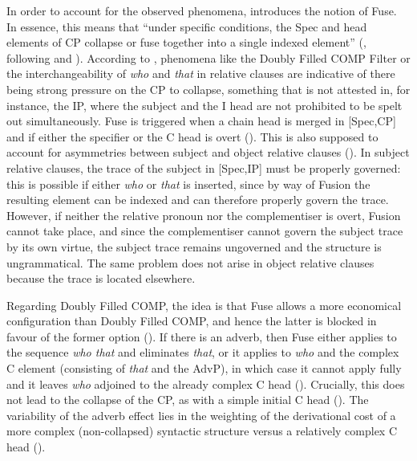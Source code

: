 \ea
{}
\z
\z

In order to account for the observed phenomena, \citet[545]{sobin2002} introduces the notion of Fuse. In essence, this means that ``under specific conditions, the Spec and head elements of CP collapse or fuse together into a single indexed element'' (\citealt[545]{sobin2002}, following \citealt{pesetsky1982} and \citealt{sobin1987}). According to \citet[546]{sobin2002}, phenomena like the Doubly Filled COMP Filter or the interchangeability of \textit{who} and \textit{that} in relative clauses are indicative of there being strong pressure on the CP to collapse, something that is not attested in, for instance, the IP, where the subject and the I head are not prohibited to be spelt out simultaneously. Fuse is triggered when a chain head is merged in [Spec,CP] and if either the specifier or the C head is overt (\citealt[546--547]{sobin2002}). This is also supposed to account for asymmetries between subject and object relative clauses (\citealt[547--548]{sobin2002}). In subject relative clauses, the trace of the subject in [Spec,IP] must be properly governed: this is possible if either \textit{who} or \textit{that} is inserted, since by way of Fusion the resulting element can be indexed and can therefore properly govern the trace. However, if neither the relative pronoun nor the complementiser is overt, Fusion cannot take place, and since the complementiser cannot govern the subject trace by its own virtue, the subject trace remains ungoverned and the structure is ungrammatical. The same problem does not arise in object relative clauses because the trace  is located elsewhere.

Regarding Doubly Filled COMP, the idea is that Fuse allows a more economical configuration than Doubly Filled COMP, and hence the latter is blocked in favour of the former option (\citealt[548--549]{sobin2002}). If there is an adverb, then Fuse either applies to the sequence \textit{who that} and eliminates \textit{that}, or it applies to \textit{who} and the complex C element (consisting of \textit{that} and the AdvP), in which case it cannot apply fully and it leaves \textit{who} adjoined to the already complex C head (\citealt[549]{sobin2002}). Crucially, this does not lead to the collapse of the CP, as with a simple initial C head (\citealt[550]{sobin2002}). The variability of the adverb effect lies in the weighting of the derivational cost of a more complex (non-collapsed) syntactic structure versus a relatively complex C head (\citealt[553]{sobin2002}).

